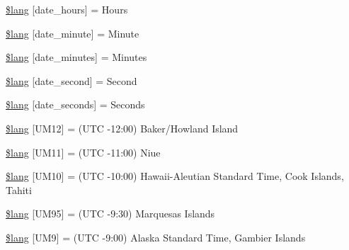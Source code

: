 \begin{DoxyCompactItemize}
\item 
\hyperlink{_admin_2system_2language_2english_2date__lang_8php_ad1fe07226d651882b9ecce9cb2011db2}{\$lang} \mbox{[}\textquotesingle{}date\+\_\+hours\textquotesingle{}\mbox{]} = \textquotesingle{}Hours\textquotesingle{}
\item 
\hyperlink{_admin_2system_2language_2english_2date__lang_8php_a999a95f4f9c529af571d30f9615c93f3}{\$lang} \mbox{[}\textquotesingle{}date\+\_\+minute\textquotesingle{}\mbox{]} = \textquotesingle{}Minute\textquotesingle{}
\item 
\hyperlink{_admin_2system_2language_2english_2date__lang_8php_ab41862e6c3ef784a6e32992cfb9a6e1c}{\$lang} \mbox{[}\textquotesingle{}date\+\_\+minutes\textquotesingle{}\mbox{]} = \textquotesingle{}Minutes\textquotesingle{}
\item 
\hyperlink{_admin_2system_2language_2english_2date__lang_8php_ac1b67b9034a78d631bf5302df6105136}{\$lang} \mbox{[}\textquotesingle{}date\+\_\+second\textquotesingle{}\mbox{]} = \textquotesingle{}Second\textquotesingle{}
\item 
\hyperlink{_admin_2system_2language_2english_2date__lang_8php_a0a75c76e6e4be09a6c5f1a1727fa2c78}{\$lang} \mbox{[}\textquotesingle{}date\+\_\+seconds\textquotesingle{}\mbox{]} = \textquotesingle{}Seconds\textquotesingle{}
\item 
\hyperlink{_admin_2system_2language_2english_2date__lang_8php_aa03db528f49f0bdd57489a7e057a95dc}{\$lang} \mbox{[}\textquotesingle{}U\+M12\textquotesingle{}\mbox{]} = \textquotesingle{}(U\+T\+C -\/12\+:00) Baker/Howland Island\textquotesingle{}
\item 
\hyperlink{_admin_2system_2language_2english_2date__lang_8php_a2257b69398113162bdafb48f1bab4973}{\$lang} \mbox{[}\textquotesingle{}U\+M11\textquotesingle{}\mbox{]} = \textquotesingle{}(U\+T\+C -\/11\+:00) Niue\textquotesingle{}
\item 
\hyperlink{_admin_2system_2language_2english_2date__lang_8php_a671d507e120e16f7e7718be0ed0aea74}{\$lang} \mbox{[}\textquotesingle{}U\+M10\textquotesingle{}\mbox{]} = \textquotesingle{}(U\+T\+C -\/10\+:00) Hawaii-\/Aleutian Standard Time, Cook Islands, Tahiti\textquotesingle{}
\item 
\hyperlink{_admin_2system_2language_2english_2date__lang_8php_a7cd7a4418ccf42c7daae2a098ba8f9e6}{\$lang} \mbox{[}\textquotesingle{}U\+M95\textquotesingle{}\mbox{]} = \textquotesingle{}(U\+T\+C -\/9\+:30) Marquesas Islands\textquotesingle{}
\item 
\hyperlink{_admin_2system_2language_2english_2date__lang_8php_a5509302f8ddd971cb58e1f49f012bbac}{\$lang} \mbox{[}\textquotesingle{}U\+M9\textquotesingle{}\mbox{]} = \textquotesingle{}(U\+T\+C -\/9\+:00) Alaska Standard Time, Gambier Islands\textquotesingle{}

\end{DoxyCompactItemize}
